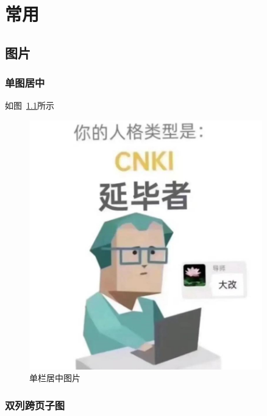 \chapter{常用}

\section{图片}

\subsection{单图居中}
如图~\ref{fig::graphexample}所示
\begin{figure}[htbp]
	\centering
	\includegraphics[width = 0.9\textwidth]{./Graphs/example/example.jpeg} 
	\caption{单栏居中图片}
	\label{fig::graphexample} 
\end{figure}
\subsection{双列跨页子图}

